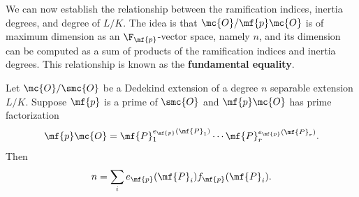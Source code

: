 \documentclass[12pt]{article}
\begin{document}
      We can now establish the relationship between the ramification indices, inertia degrees, and degree of \(L/K\). The idea is that \(\mc{O}/\mf{p}\mc{O}\) is of maximum dimension as an \(\F_{\mf{p}}\)-vector space, namely \(n\), and its dimension can be computed as a sum of products of the ramification indices and inertia degrees. This relationship is known as the \textbf{fundamental equality}.

      \begin{theorem*}
        Let \(\mc{O}/\smc{O}\) be a Dedekind extension of a degree \(n\) separable extension \(L/K\). Suppose \(\mf{p}\) is a prime of \(\smc{O}\) and \(\mf{p}\mc{O}\) has prime factorization
        \[
          \mf{p}\mc{O} = \mf{P}_{1}^{e_{\mf{p}}(\mf{P}_{1})} \cdots \mf{P}_{r}^{e_{\mf{p}}(\mf{P}_{r})}.
        \]
        Then
        \[
          n = \sum_{i}e_{\mf{p}}(\mf{P}_{i})f_{\mf{p}}(\mf{P}_{i}).
        \]
      \end{theorem*}
\end{document}

